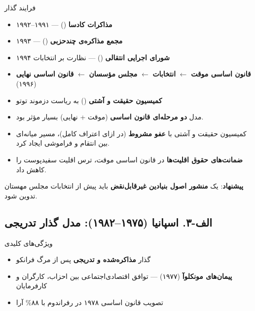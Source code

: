 \begin{bandbox}{فرایند گذار}
\begin{itemize}
  \item \textbf{مذاکرات کادسا} () --- ۱۹۹۱–۱۹۹۲
  \item \textbf{مجمع مذاکره‌ی چندحزبی} () --- ۱۹۹۳
  \item \textbf{شورای اجرایی انتقالی} () --- نظارت بر انتخابات ۱۹۹۴
  \item \textbf{قانون اساسی موقت} $\leftarrow$ \textbf{انتخابات} $\leftarrow$ \textbf{مجلس مؤسسان} $\leftarrow$ \textbf{قانون اساسی نهایی} (۱۹۹۶)
  \item \textbf{کمیسیون حقیقت و آشتی} () به ریاست دزموند توتو
\end{itemize}
\end{bandbox}

\begin{notebox}[title={\rl{دروس آموخته}}]
\begin{itemize}
  \item مدل \textbf{دو مرحله‌ای قانون اساسی} (موقت + نهایی) بسیار مؤثر بود.
  \item کمیسیون حقیقت و آشتی با \textbf{عفو مشروط} (در ازای اعتراف کامل)، مسیر میانه‌ای بین انتقام و فراموشی ایجاد کرد.
  \item \textbf{ضمانت‌های حقوق اقلیت‌ها} در قانون اساسی موقت، ترس اقلیت سفیدپوست را کاهش داد.
\end{itemize}

\textbf{پیشنهاد}: یک \textbf{منشور اصول بنیادین غیرقابل‌نقض} باید پیش از انتخابات مجلس مهستان تدوین شود.
\end{notebox}

\subsection{الف-۳. اسپانیا (۱۹۷۵–۱۹۸۲): مدل گذار تدریجی}

\begin{bandbox}{ویژگی‌های کلیدی}
\begin{itemize}
  \item گذار \textbf{مذاکره‌شده و تدریجی} پس از مرگ فرانکو
  \item \textbf{پیمان‌های مونکلوآ} (۱۹۷۷) --- توافق اقتصادی‌اجتماعی بین احزاب، کارگران و کارفرمایان
  \item تصویب قانون اساسی ۱۹۷۸ در رفراندوم با ۸۸\% آرا
\end{itemize}
\end{bandbox}


